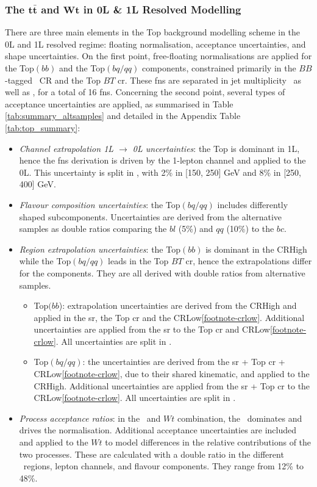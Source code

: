 \subsubsection{The $\boldsymbol{t\bar{t}}$ and $\boldsymbol{Wt}$ in 0L \& 1L Resolved Modelling}
There are three main elements in the Top background modelling scheme in the 0L and 1L resolved regime: floating normalisation, acceptance uncertainties, and shape uncertainties. On the first point, free-floating normalisations are applied for the Top$(bb)$ and the Top$(bq/qq)$ components, constrained primarily in the $BB$-tagged \highdr\ CR and the Top $BT$ \gls{cr}. These \glspl{fn} are separated in jet multiplicity \nj\ as well as \ptv, for a total of 16 \glspl{fn}. Concerning the second point, several types of acceptance uncertainties are applied, as summarised in Table \ref{tab:summary_altsamples} and detailed in the Appendix Table \ref{tab:top_summary}:
\begin{itemize}[leftmargin=*]
    \item \textit{Channel extrapolation 1L $\rightarrow$ 0L uncertainties}: the Top is dominant in 1L, hence the \glspl{fn} derivation is driven by the 1-lepton channel and applied to the 0L. This uncertainty is split in \ptv, with 2\% in [150, 250] GeV and 8\% in [250, 400] GeV.
    \item \textit{Flavour composition uncertainties}: the Top$(bq/qq)$ includes differently shaped subcomponents. Uncertainties are derived from the alternative samples as double ratios comparing the $bl$ (5\%) and $qq$ (10\%) to the $bc$. 
    \item \textit{Region extrapolation uncertainties}: the Top$(bb)$ is dominant in the CRHigh while the Top$(bq/qq)$ leads in the Top $BT$ \gls{cr}, hence the extrapolations differ for the components. They are all derived with double ratios from alternative samples.
    \begin{itemize}
        \item Top$(bb$): extrapolation uncertainties are derived from the CRHigh and applied in the \gls{sr}, the Top \gls{cr} and the CRLow\cref{footnote-crlow}. Additional uncertainties are applied from the \gls{sr} to the Top \gls{cr} and CRLow\cref{footnote-crlow}. All uncertainties are split in \ptv.
        \item Top$(bq/qq)$: the uncertainties are derived from the \gls{sr} + Top \gls{cr} + CRLow\cref{footnote-crlow}, due to their shared kinematic, and applied to the CRHigh. Additional uncertainties are applied from the \gls{sr} + Top \gls{cr} to the CRLow\cref{footnote-crlow}. All uncertainties are split in \ptv.
    \end{itemize}
    \item \textit{Process acceptance ratios}: in the \ttb\ and $Wt$ combination, the \ttb\ dominates and drives the normalisation. Additional acceptance uncertainties are included and applied to the $Wt$ to model differences in the relative contributions of the two processes. These are calculated with a double ratio in the different \ptv\ regions, lepton channels, and flavour components. They range from 12\% to 48\%.
\end{itemize}
